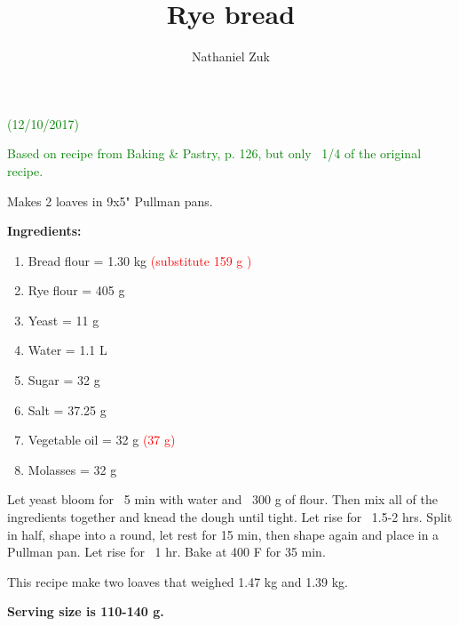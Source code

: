 \usepackage{parskip}
\usepackage{color}

\title{Rye bread}
\author{Nathaniel Zuk}


\maketitle

\textcolor{green}{(12/10/2017)}

\textcolor{green}{Based on recipe from Baking \& Pastry, p. 126, but only ~1/4 of the original recipe.}

Makes 2 loaves in 9x5" Pullman pans.

\textbf{Ingredients:}

\begin{enumerate}
\item Bread flour = 1.30 kg \textcolor{red}{(substitute 159 g )}
\item Rye flour = 405 g
\item Yeast = 11 g
\item Water = 1.1 L
\item Sugar = 32 g
\item Salt = 37.25 g
\item Vegetable oil = 32 g \textcolor{red}{(37 g)}
\item Molasses = 32 g
\end{enumerate}

Let yeast bloom for ~5 min with water and ~300 g of flour.  Then mix all of the ingredients together and knead the dough until tight.  Let rise for ~1.5-2 hrs.  Split in half, shape into a round, let rest for 15 min, then shape again and place in a Pullman pan.  Let rise for ~1 hr. Bake at 400 F for 35 min.

This recipe make two loaves that weighed 1.47 kg and 1.39 kg.

\textbf{Serving size is 110-140 g.}

